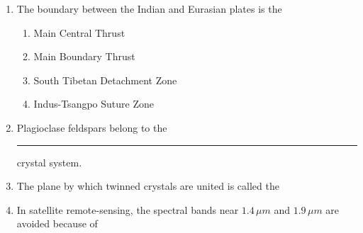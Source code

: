 \documentclass[journal,12pt,onecolumn,fleqn]{IEEEtran}
\theoremstyle{remark}
\theoremstyle{remark}
\begin{document}
\begin{enumerate}[label=Q.\arabic*.]
\begin {enumerate}
            \end{enumerate}
    \item The boundary between the Indian and Eurasian plates is the \hfill{} 
        \begin{enumerate}
                \item Main Central Thrust
                \item Main Boundary Thrust
                \item South Tibetan Detachment Zone
                \item Indus-Tsangpo Suture Zone                
            \end{enumerate}
    \item Plagioclase feldspars belong to the \rule{2.5cm}{0.15mm} crystal system. \hfill{} 
        \begin {enumerate}
            \end{enumerate}
    \item The plane by which twinned crystals are united is called the \hfill{} 
        \begin {enumerate}
            \end{enumerate}
    \item In satellite remote-sensing, the spectral bands near $1.4\,\mu m$ and $1.9\,\mu m$ are avoided because of \hfill{} 

\end{enumerate}
\end{document}
